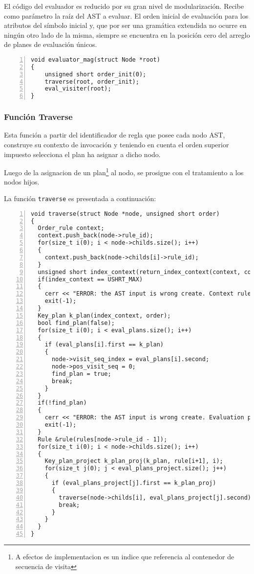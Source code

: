 \documentclass[runningheads,a4paper]{llncs}
\begin{document}
El código del evaluador es reducido por su gran nivel de modularización. Recibe como parámetro la raíz del AST a evaluar. El orden inicial de evaluación para los atributos del símbolo inicial y, que por ser una gramática extendida no ocurre en ningún otro lado de la misma, siempre se encuentra en la posición cero del arreglo de planes de evaluación únicos.

\begin{lstlisting}[numbers=left, columns=fullflexible, linewidth=6.8cm]
void evaluator_mag(struct Node *root)
{
    unsigned short order_init(0);
    traverse(root, order_init);
    eval_visiter(root);
}
\end{lstlisting}

\subsubsection{Función Traverse}

Esta función a partir del identificador de regla que posee cada nodo AST, construye su contexto de invocación y teniendo en cuenta el orden superior impuesto selecciona el plan ha asignar a dicho nodo.

Luego de la asignacion de un plan\footnote{A efectos de implementacion es un indice que referencia al contenedor de secuencia de visita} al nodo, se prosigue con el tratamiento a los nodos hijos.

La función \texttt{traverse} es presentada a continuación:


\begin{lstlisting}[numbers=left, columns=fullflexible]
void traverse(struct Node *node, unsigned short order)
{
  Order_rule context;
  context.push_back(node->rule_id);
  for(size_t i(0); i < node->childs.size(); i++)
  {
    context.push_back(node->childs[i]->rule_id);
  }
  unsigned short index_context(return_index_context(context, contexts_rule));
  if(index_context == USHRT_MAX)
  {
    cerr << "ERROR: the AST input is wrong create. Context rule does not exist." << endl;
    exit(-1);
  }
  Key_plan k_plan(index_context, order);
  bool find_plan(false);
  for(size_t i(0); i < eval_plans.size(); i++)
  {
    if (eval_plans[i].first == k_plan)
    {
      node->visit_seq_index = eval_plans[i].second;
      node->pos_visit_seq = 0;
      find_plan = true;
      break;
    }
  }
  if(!find_plan)
  {
    cerr << "ERROR: the AST input is wrong create. Evaluation plan does not exist." << endl;
    exit(-1);
  }
  Rule &rule(rules[node->rule_id - 1]);
  for(size_t i(0); i < node->childs.size(); i++)
  {
    Key_plan_project k_plan_proj(k_plan, rule[i+1], i);
    for(size_t j(0); j < eval_plans_project.size(); j++)
    {
      if (eval_plans_project[j].first == k_plan_proj)
      {
        traverse(node->childs[i], eval_plans_project[j].second);
        break;
      }
    }
  }
}
\end{lstlisting}
\end{document}
